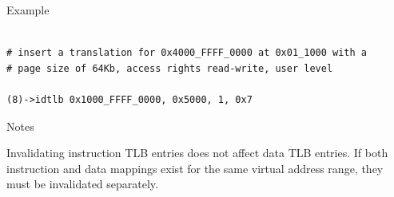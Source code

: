 \begin{iPageDescOpEntry}{Example}
\begin{lstlisting}[style=iPageOpStyle]

# insert a translation for 0x4000_FFFF_0000 at 0x01_1000 with a 
# page size of 64Kb, access rights read-write, user level

(8)->idtlb 0x1000_FFFF_0000, 0x5000, 1, 0x7
\end{lstlisting}
\end{iPageDescOpEntry}

\begin{iPageDescEntry}{Notes}

Invalidating instruction TLB entries does not affect data TLB entries. If both
instruction and data mappings exist for the same virtual address range, they
must be invalidated separately.

\end{iPageDescEntry}

